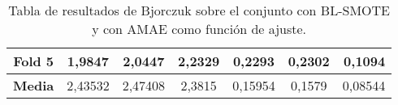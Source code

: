 \begin{table}[H]
{\begin{tabular}{|crrrrrr|}
\multicolumn{1}{|c|}{\textbf{Fold 5}}            & \multicolumn{1}{c|}{1,9847}            & \multicolumn{1}{c|}{2,0447}              & \multicolumn{1}{c|}{2,2329}          & \multicolumn{1}{c|}{0,2293}            & \multicolumn{1}{c|}{0,2302}              & \textbf{0,1094} \\ \hline
\multicolumn{1}{|c|}{\textbf{Media}}             & \multicolumn{1}{c|}{2,43532}           & \multicolumn{1}{c|}{2,47408}             & \multicolumn{1}{c|}{2,3815}          & \multicolumn{1}{c|}{0,15954}           & \multicolumn{1}{c|}{0,1579}              & 0,08544         \\ \hline
\end{tabular}%
}
\caption{Tabla de resultados de Bjorczuk sobre el conjunto con BL-SMOTE y con AMAE como función de ajuste.}\label{tablaBJORCZUKconBLSMOTEconAMAE}

\end{table}



